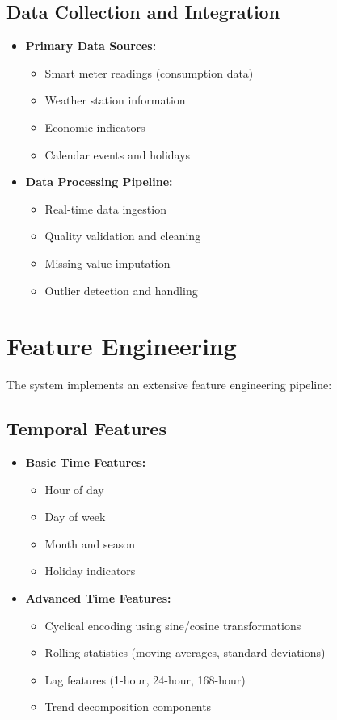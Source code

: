 \documentclass[12pt,a4paper]{report}
\begin{document}
\subsection{Data Collection and Integration}
\begin{itemize}
\item \textbf{Primary Data Sources:}
  \begin{itemize}
    \item Smart meter readings (consumption data)
    \item Weather station information
    \item Economic indicators
    \item Calendar events and holidays
  \end{itemize}
  
\item \textbf{Data Processing Pipeline:}
  \begin{itemize}
    \item Real-time data ingestion
    \item Quality validation and cleaning
    \item Missing value imputation
    \item Outlier detection and handling
  \end{itemize}
\end{itemize}

\section{Feature Engineering}
The system implements an extensive feature engineering pipeline:

\subsection{Temporal Features}
\begin{itemize}
\item \textbf{Basic Time Features:}
  \begin{itemize}
    \item Hour of day
    \item Day of week
    \item Month and season
    \item Holiday indicators
  \end{itemize}

\item \textbf{Advanced Time Features:}
  \begin{itemize}
    \item Cyclical encoding using sine/cosine transformations
    \item Rolling statistics (moving averages, standard deviations)
    \item Lag features (1-hour, 24-hour, 168-hour)
    \item Trend decomposition components
  \end{itemize}
\end{itemize}
\end{document}
